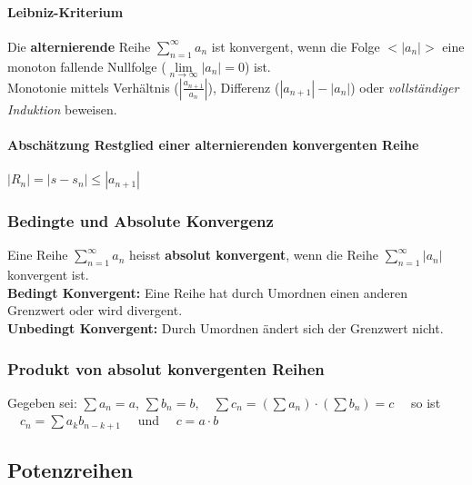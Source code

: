 \paragraph{Leibniz-Kriterium}
Die \textbf{alternierende} Reihe $ \sum\limits_{n=1}^{\infty} a_n $ ist konvergent, wenn die Folge $<\left|a_n\right|>$ eine monoton fallende Nullfolge ($\lim\limits_{n \to \infty}
\left|a_n\right| = 0 $) ist.
\\ Monotonie mittels Verhältnis ($ \left|\frac{a_{n+1}}{a_n}\right| $), Differenz ($ |a_{n+1}| - |a_n| $) oder \textit{vollständiger Induktion} beweisen.\\ 

\paragraph{Abschätzung Restglied einer alternierenden konvergenten Reihe}\qquad $|R_n| = |s-s_n|\leq |a_{n+1}|$


\subsubsection{Bedingte und Absolute Konvergenz}
Eine Reihe $\sum\limits_{n=1}^{\infty}a_n$ heisst \textbf{absolut konvergent}, wenn die
Reihe $\sum\limits_{n=1}^{\infty}|a_n|$ konvergent ist.\\
\textbf{Bedingt Konvergent:} Eine Reihe hat durch Umordnen einen anderen
Grenzwert oder wird divergent.\\
\textbf{Unbedingt Konvergent:} Durch Umordnen ändert sich der Grenzwert nicht.

\subsubsection{Produkt von absolut konvergenten Reihen} 
Gegeben sei: $\sum a_n=a$, \quad $\sum b_n=b, \quad \sum c_n = (\sum a_n) \cdot (\sum b_n) = c \quad $ so ist
$ \quad c_n=\sum a_kb_{n-k+1} \quad $ und $ \quad c = a \cdot b $



\subsection{Potenzreihen}



